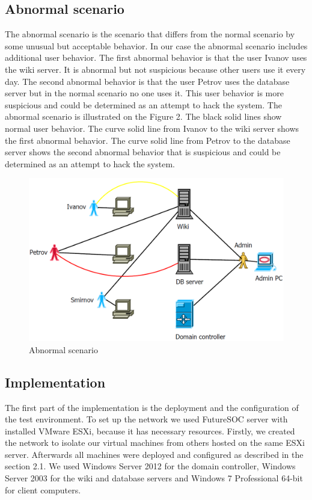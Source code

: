 \subsection{Abnormal scenario}
The abnormal scenario is the scenario that differs from the normal scenario by some unusual but acceptable behavior. In our case the abnormal scenario includes additional user behavior. The first abnormal behavior is that the user Ivanov uses the wiki server. It is abnormal but not suspicious because other users use it every day. The second abnormal behavior is that the user Petrov uses the database server but in the normal scenario no one uses it. This user behavior is more suspicious and could be determined as an attempt to hack the system. The abnormal scenario is illustrated on the Figure 2. The black solid lines show normal user behavior. The curve solid line from Ivanov to the wiki server shows the first abnormal behavior. The curve solid line from Petrov to the database server shows the second abnormal behavior that is suspicious and could be determined as an attempt to hack the system. 
\begin{figure}[ht!]
\centering
\includegraphics[width=\textwidth]{scenario_abnormal.png}
\caption{Abnormal scenario}
\label{overflow}
\end{figure}

\subsection{Implementation}
The first part of the implementation is the deployment and the configuration of the test environment. To set up the network we used FutureSOC server with installed VMware ESXi, because it has necessary resources. Firstly, we created the network to isolate our virtual machines from others hosted on the same ESXi server. Afterwards all machines were deployed and configured as described in the section 2.1. We used Windows Server 2012 for the domain controller, Windows Server 2003 for the wiki and database servers and Windows 7 Professional 64-bit for client computers. 

